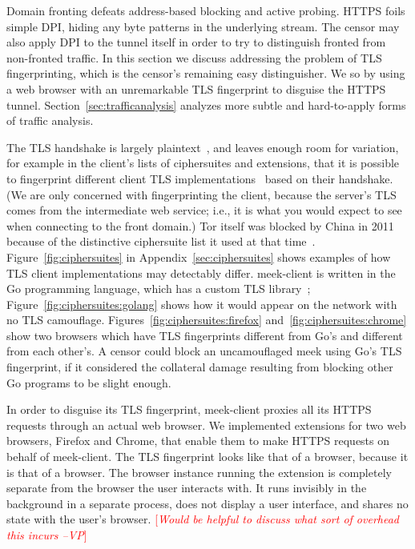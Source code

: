\documentclass{sig-alternate}
\newcommand{\meekclient}{\mbox{meek-client}\xspace}
\newcommand{\meek}{meek\xspace}
\newcommand{\note}[1]{{\textcolor{red}{[\textit{#1}]}}}
\newcommand{\vp}[1]{\note{#1 --VP}}
\begin{document}
Domain fronting defeats address-based blocking and active probing.
HTTPS foils simple DPI,
hiding any byte patterns in the underlying stream.
The censor may also apply DPI to the tunnel itself in order to try to
distinguish fronted from non-fronted traffic.
In this section we discuss addressing the problem of TLS fingerprinting,
which is the censor's remaining easy distinguisher.
We so by using a web browser with an unremarkable TLS fingerprint
to disguise the HTTPS tunnel.
Section~\ref{sec:trafficanalysis} analyzes
more subtle and hard-to-apply forms of traffic analysis.

The TLS handshake is largely plaintext~\cite[\S7.4]{rfc5246}, and leaves
enough room for variation, for example in
the client's lists of ciphersuites and extensions,
that it is possible to fingerprint different client TLS implementations~\cite{ssl-p0f}
based on their handshake.
(We are only concerned with fingerprinting the client,
because the server's TLS
comes from the intermediate web service;
i.e., it is what you would expect to see when connecting to the front domain.)
Tor itself was blocked by China in 2011
because of the distinctive ciphersuite list it used at that time~\cite{bug4744}.
Figure~\ref{fig:ciphersuites} in Appendix~\ref{sec:ciphersuites} shows examples of how TLS client
implementations may detectably differ.
\meekclient is written in the Go programming language,
which has a custom TLS library~\cite{golang-crypto/tls};
Figure~\ref{fig:ciphersuites:golang}
shows how it would appear on the network with no TLS camouflage.
Figures~\ref{fig:ciphersuites:firefox} and~\ref{fig:ciphersuites:chrome}
show two browsers which have TLS fingerprints different from Go's
and different from each other's.
A censor could block an uncamouflaged \meek using Go's TLS fingerprint,
if it considered the collateral damage resulting from blocking other Go programs to be slight enough.

In order to disguise its TLS fingerprint,
\meekclient proxies all its HTTPS requests through an actual web browser.
We implemented extensions for two web browsers,
Firefox and Chrome,
that enable them to make HTTPS requests on behalf of \meekclient.
The TLS fingerprint looks like that of a browser, because it is that of a browser.
The browser instance running the extension is completely separate
from the browser the user interacts with.
It runs invisibly in the background in a separate process,
does not display a user interface,
and shares no state with the user's browser.
\vp{Would be helpful to discuss what sort of overhead this incurs}
\end{document}
